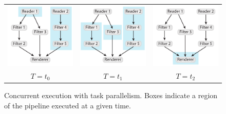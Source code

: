 \documentclass[journal,twocolumn,10pt,letterpaper,twoside]{IEEEtran}
\begin{document}
\begin{figure}[htbp]
  \centering
  \begin{tabular}{@{}c@{\qquad}c@{\qquad}c@{}}
    \includegraphics[scale=.9]{images/TaskParallel0} &
    \includegraphics[scale=.9]{images/TaskParallel1} &
    \includegraphics[scale=.9]{images/TaskParallel2} \\
    $T = t_0$ & $T = t_1$ & $T = t_2$
  \end{tabular}
  \caption{Concurrent execution with task parallelism.  Boxes indicate a
    region of the pipeline executed at a given time.}
  \label{fig:TaskParallelism}
\end{figure}
\end{document}
